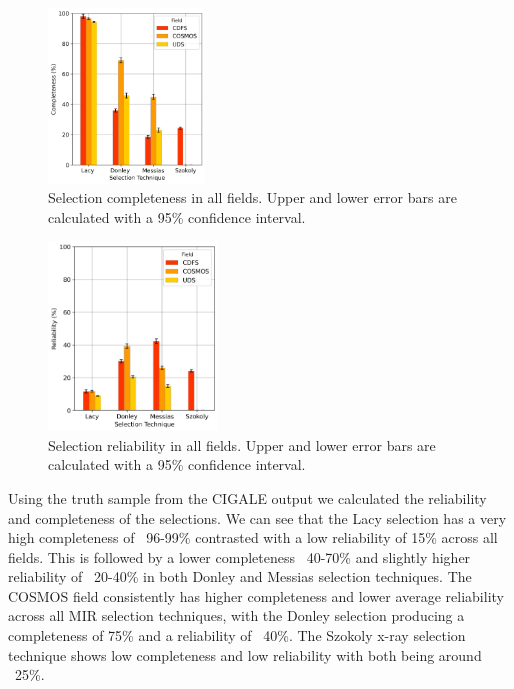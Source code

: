 \documentclass[11pt]{iopart}
\begin{document}
\begin{figure}[h]
  \centering
  \includegraphics[width=0.37\textwidth]{plots/TechniqueCompleteness.png}
  \caption{Selection completeness in all fields. Upper and lower error bars are calculated with a 95\% confidence interval.}
  \label{fig:Completeness}
\end{figure}
\newpage
\begin{figure}[h]
  \centering
  \includegraphics[width=0.40\textwidth]{plots/TechniqueReliability.png}
  \caption{Selection reliability in all fields. Upper and lower error bars are calculated with a 95\% confidence interval.}
  \label{fig:Completeness}
\end{figure}
Using the truth sample from the CIGALE output we calculated the reliability and completeness of the selections. We can see that the Lacy selection has a very high completeness of ~96-99\% contrasted with a low reliability of 15\% across all fields. This is followed by a lower completeness ~40-70\% and slightly higher reliability of ~20-40\% in both Donley and Messias selection techniques. The COSMOS field consistently has higher completeness and lower average reliability across all MIR selection techniques, with the Donley selection producing a completeness of 75\% and a reliability of ~40\%. The Szokoly x-ray selection technique shows low completeness and low reliability with both being around ~25\%. 
\end{document}
